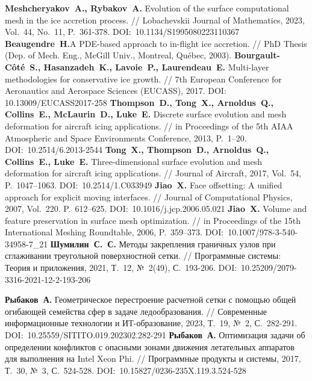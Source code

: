 \begin{thebibliography}{99}

\textbf{Meshcheryakov~A., Rybakov~A.} Evolution of the surface computational mesh in the ice accretion process. // Lobachevskii Journal of Mathematics, 2023, Vol.~44, No.~11, P.~361-378. DOI:~10.1134/S1995080223110367
\textbf{Beaugendre~H.}A PDE-based approach to in-flight ice accretion. // PhD Thesis (Dep. of Mech. Eng., McGill Univ., Montreal, Qu{\'e}bec, 2003).
\textbf{Bourgault-Côté~S., Hasanzadeh~K., Lavoie~P., Laurendeau~E.} Multi-layer methodologies for conservative ice growth. // 7th European Conference for Aeronautics and Aerospace Sciences (EUCASS), 2017. DOI: 10.13009/EUCASS2017-258
\textbf{Thompson~D., Tong~X., Arnoldus~Q., Collins~E., McLaurin~D., Luke~E.} Discrete surface evolution and mesh deformation for aircraft icing applications. // in Proceedings of the 5th AIAA Atmospheric and Space Environments Conference, 2013, P.~1–20. DOI:~10.2514/6.2013-2544
\textbf{Tong~X., Thompson~D., Arnoldus~Q., Collins~E., Luke~E.} Three-dimensional surface evolution and mesh deformation for aircraft icing applications. // Journal of Aircraft, 2017, Vol.~54, P.~1047–1063. DOI:~10.2514/1.C033949
\textbf{Jiao~X.} Face offsetting: A unified approach for explicit moving interfaces. // Journal of Computational Physics, 2007, Vol.~220. P.~612–625. DOI:~10.1016/j.jcp.2006.05.021
\textbf{Jiao~X.} Volume and feature preservation in surface mesh optimization. // in Proceedings of the 15th International Meshing Roundtable, 2006, P.~359–373. DOI:~10.1007/978-3-540-34958-7\_21
\textbf{Шумилин~С.~С.} Методы закрепления граничных узлов при сглаживании треугольной поверхностной сетки. // Программные системы: Теория и приложения, 2021, Т.~12, №~2(49), С.~193-206. DOI:~10.25209/2079-3316-2021-12-2-193-206

\textbf{Рыбаков~А.} Геометрическое перестроение расчетной сетки с помощью общей огибающей семейства сфер в задаче ледообразования. // Современные информационные технологии и ИТ-образование, 2023, Т.~19, №~2, С.~282-291. DOI:~10.25559/SITITO.019.202302.282-291
\textbf{Рыбаков~А.} Оптимизация задачи об определении конфликтов с опасными зонами движения летательных аппаратов для выполнения на Intel Xeon Phi. // Программные продукты и системы, 2017, Т.~30, №~3, С.~524-528. DOI:~10.15827/0236-235X.119.3.524-528


\end{thebibliography}
